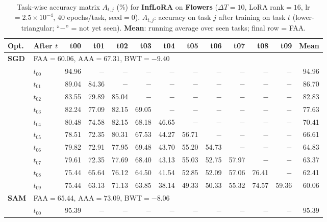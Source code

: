 \begin{table}[ht]
\centering
\caption{%
  Task-wise accuracy matrix $A_{t,j}$ (\%) for \textbf{InfLoRA} on \textbf{Flowers} ($\Delta T=10$, LoRA rank$=16$, lr$=2.5\times10^{-4}$, 40 epochs/task, seed$=0$).
  $A_{t,j}$: accuracy on task $j$ after training on task $t$  (lower-triangular; ``$-$'' = not yet seen).
  \textbf{Mean}: running average over seen tasks; final row = FAA.
}
\label{tab:raw_inflora_flowers}
\setlength{\tabcolsep}{2.8pt}
\renewcommand{\arraystretch}{0.88}
\scriptsize
\begin{tabular}{@{}l l r r r r r r r r r r r@{}}
\toprule
\textbf{Opt.} & \textbf{After $t$} & \textbf{t00} & \textbf{t01} & \textbf{t02} & \textbf{t03} & \textbf{t04} & \textbf{t05} & \textbf{t06} & \textbf{t07} & \textbf{t08} & \textbf{t09} & \textbf{Mean} \\
\midrule
\multirow{11}{*}{\textbf{SGD}} & \multicolumn{12}{l}{\quad\small FAA$=60.06$,\; AAA$=67.31$,\; BWT$=-9.40$} \\
 & $t_{00}$ & 94.96 & $-$ & $-$ & $-$ & $-$ & $-$ & $-$ & $-$ & $-$ & $-$ & 94.96 \\
 & $t_{01}$ & 89.04 & 84.36 & $-$ & $-$ & $-$ & $-$ & $-$ & $-$ & $-$ & $-$ & 86.70 \\
 & $t_{02}$ & 83.55 & 79.89 & 85.04 & $-$ & $-$ & $-$ & $-$ & $-$ & $-$ & $-$ & 82.83 \\
 & $t_{03}$ & 82.24 & 77.09 & 82.15 & 69.05 & $-$ & $-$ & $-$ & $-$ & $-$ & $-$ & 77.63 \\
 & $t_{04}$ & 80.48 & 74.58 & 82.15 & 68.18 & 46.65 & $-$ & $-$ & $-$ & $-$ & $-$ & 70.41 \\
 & $t_{05}$ & 78.51 & 72.35 & 80.31 & 67.53 & 44.27 & 56.71 & $-$ & $-$ & $-$ & $-$ & 66.61 \\
 & $t_{06}$ & 79.82 & 72.91 & 77.95 & 69.48 & 43.70 & 55.20 & 54.73 & $-$ & $-$ & $-$ & 64.83 \\
 & $t_{07}$ & 79.61 & 72.35 & 77.69 & 68.40 & 43.13 & 55.03 & 52.75 & 57.97 & $-$ & $-$ & 63.37 \\
 & $t_{08}$ & 75.44 & 65.64 & 76.12 & 64.50 & 41.54 & 52.85 & 52.09 & 57.06 & 76.41 & $-$ & 62.41 \\
 & $t_{09}$ & 75.44 & 63.13 & 71.13 & 63.85 & 38.14 & 49.33 & 50.33 & 55.32 & 74.57 & 59.36 & 60.06 \\
\midrule
\multirow{11}{*}{\textbf{SAM}} & \multicolumn{12}{l}{\quad\small FAA$=65.44$,\; AAA$=73.09$,\; BWT$=-8.06$} \\
 & $t_{00}$ & 95.39 & $-$ & $-$ & $-$ & $-$ & $-$ & $-$ & $-$ & $-$ & $-$ & 95.39 \\

\end{tabular}
\end{table}
